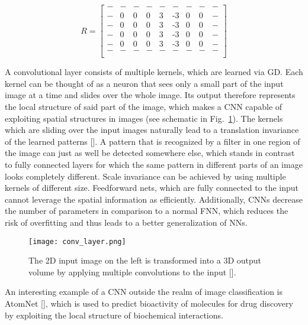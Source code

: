 \begin{equation}
  \newcommand{\nan}{-}
  \newcommand{\minus}{\text{-}}
	R = \begin{bmatrix}
    \nan & \nan & \nan & \nan & \nan & \nan  & \nan & \nan & \nan\\
    \nan & 0 & 0 & 0 & 3 & \minus 3 & 0 & 0 & \nan\\
    \nan & 0 & 0 & 0 & 3 & \minus 3 & 0 & 0 & \nan\\
    \nan & 0 & 0 & 0 & 3 & \minus 3 & 0 & 0 & \nan\\
    \nan & 0 & 0 & 0 & 3 & \minus 3 & 0 & 0 & \nan\\
    \nan & \nan & \nan & \nan & \nan & \nan  & \nan & \nan & \nan\\
  \end{bmatrix}
\end{equation}

A convolutional layer consists of multiple kernels, which are learned via GD.
Each kernel can be thought of as a neuron that sees only a small part of the
input image at a time and slides over the whole image. Its output therefore
represents the local structure of said part of the image, which makes
a CNN capable of exploiting spatial structures in images (see schematic in
Fig.~\ref{fig:conv_layer}).  The kernels which are sliding over the input
images naturally lead to a translation invariance of the learned patterns
[\cite{lecun1995convolutional}]. A pattern that is recognized by a filter in one
region of the image can just as well be detected somewhere else, which stands
in contrast to fully connected layers for which the same pattern in different
parts of an image looks completely different.  Scale invariance can be achieved
by using multiple kernels of different size.  Feedforward nets, which are fully
connected to the input cannot leverage the spatial information as efficiently.
Additionally, CNNs decrease the number of parameters in comparison to a normal
FNN, which reduces the risk of overfitting and thus leads to a better
generalization of NNs.
\begin{figure}
  \centering
  \texttt{[image: conv\_layer.png]}
  \caption{The 2D input image on the left is transformed into a 3D output
  volume by applying multiple convolutions to the input [\cite{conv_layer_wiki}].}
  \label{fig:conv_layer}
\end{figure}

An interesting example of a CNN outside the realm of image classification is
AtomNet [\cite{dzamba1510atomnet}], which is used to predict bioactivity of
molecules for drug discovery by exploiting the local structure of biochemical
interactions.


